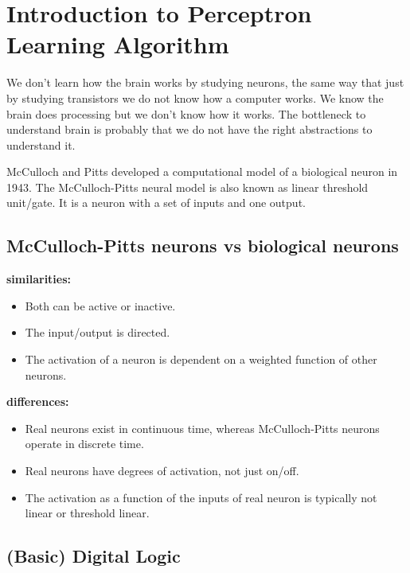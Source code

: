 \documentclass[main]{subfiles}
\begin{document}

\section{Introduction to Perceptron Learning Algorithm}

We don't learn how the brain works by studying neurons, the same way that just by studying transistors we do not know how a computer works.
We know the brain does processing but we don't know how it works.
The bottleneck to understand brain is probably that we do not have the right abstractions to understand it.

McCulloch and Pitts developed a computational model of a biological neuron in 1943.
The McCulloch-Pitts neural model is also known as linear threshold unit/gate. It is a neuron with a set of inputs and one output.

\subsection{McCulloch-Pitts neurons vs biological neurons}
\textbf{similarities:}
\begin{itemize}[noitemsep,nolistsep]
	\item Both can be active or inactive.
	\item The input/output is directed.
	\item The activation of a neuron is dependent on a weighted function of other neurons.
\end{itemize}
\textbf{differences:}
\begin{itemize}[noitemsep,nolistsep]
	\item Real neurons exist in continuous time, whereas McCulloch-Pitts neurons operate in discrete time.
	\item Real neurons have degrees of activation, not just on/off.
	\item The activation as a function of the inputs of real neuron is typically not linear or threshold linear.
\end{itemize}

\subsection{(Basic) Digital Logic}
\end{document}

